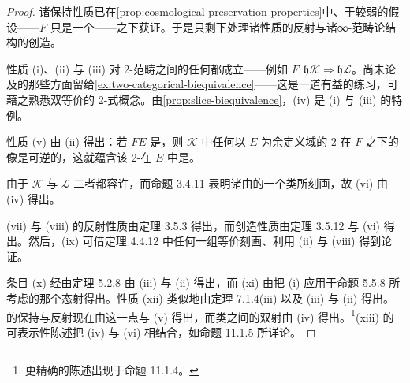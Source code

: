 \begin{proof}
诸保持性质已在\cref{prop:cosmological-preservation-properties}中、于较弱的假设——$F$ 只是一个\trCosmologicalFunctor——之下获证。于是只剩下处理诸性质的反射与诸∞-范畴论结构的创造。

性质 (i)、(ii) 与 (iii) 对 2-范畴之间的任何\trBiequivalence{}都成立——例如 $F\colon\mathfrak{h}\mathcal{K}\Rightarrow\mathfrak{h}\mathcal{L}$。尚未论及的那些方面留给\cref{ex:two-categorical-biequivalence}——这是一道有益的练习，可藉之熟悉双等价的 2-\trCategory{}式概念。由\cref{prop:slice-biequivalence}，(iv) 是 (i) 与 (iii) 的特例。

性质 (v) 由 (ii) 得出：若 $FE$ 是\trDiscrete，则 $\mathcal{K}$ 中任何以 $E$ 为余定义域的 2-\trCell{}在 $F$ 之下的像是可逆的，这就蕴含该 2-\trCell{}在 $E$ 中是\trInvertible。

由于 $\mathcal{K}$ 与 $\mathcal{L}$ 二者都容许\trCommaInfinityCategory，而命题 3.4.11 表明诸\trCommaSpan{}由\trTwoSidedIsofibration{}的一个\trFiberedEquivalence{}类所刻画，故 (vi) 由 (iv) 得出。

(vii) 与 (viii) 的反射性质由定理 3.5.3 得出，而创造性质由定理 3.5.12 与 (vi) 得出。然后，(ix) 可借定理 4.4.12 中任何一组等价刻画、利用 (ii) 与 (viii) 得到论证。

条目 (x) 经由定理 5.2.8 由 (iii) 与 (ii) 得出，而 (xi) 由把 (i) 应用于命题 5.5.8 所考虑的那个态射得出。性质 (xii) 类似地由定理 7.1.4(iii) 以及 (iii) 与 (ii) 得出。\trModule{}的保持与反射现在由这一点与 (v) 得出，而\trEquivalence{}类之间的双射由 (iv) 得出。\footnote{更精确的陈述出现于命题 11.1.4。}(xiii) 的可表示性陈述把 (iv) 与 (vi) 相结合，如命题 11.1.5 所详论。
\end{proof}

